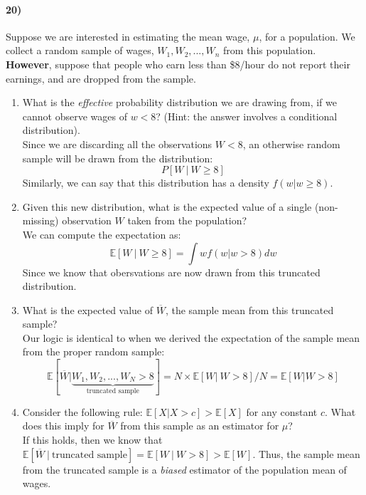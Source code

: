 \documentclass[12pt]{article}
\newcommand\ov{\overline}
\newcommand\EE{\mathbb{E}}
\numberwithin{equation}{section}
\numberwithin{figure}{section}
\numberwithin{table}{section}
\begin{document}
\paragraph{20)} Suppose we are interested in estimating the mean wage, $\mu$, for a population. We collect a random sample of wages, $W_1,W_2,...,W_n$ from this population. \textbf{However}, suppose that people who earn less than \$8/hour do not report their earnings, and are dropped from the sample.
\begin{enumerate}
\item What is the \emph{effective} probability distribution we are drawing from, if we cannot observe wages of $w<8$? (Hint: the answer involves a conditional distribution). \\
{\color{blue}
Since we are discarding all the observations $W<8$, an otherwise random sample will be drawn from the distribution: \\
\[P[W\ |\ W\geq8]\]
Similarly, we can say that this distribution has a density $f(w|w\geq8)$.
}

\item Given this new distribution, what is the expected value of a single (non-missing) observation $W$ taken from the population? \\
{\color{blue}
We can compute the expectation as:
\[\EE[W\ |\ W\geq 8] = \int wf(w|w>8)dw\]
Since we know that obersvations are now drawn from this truncated distribution.
}

\item What is the expected value of $\ov{W}$, the sample mean from this truncated sample?\\
{\color{blue}
Our logic is identical to when we derived the expectation of the sample mean from the proper random sample:
\[\EE[\ov{W}|\underbrace{W_1,W_2,...,W_N>8}_{\text{truncated sample}}] = N\times \EE[W|\ W>8]/N = \EE[W|W>8]\]
}

\item Consider the following rule: $\EE[X|X>c]>\EE[X]$ for any constant $c$. What does this imply for $\ov{W}$ from this sample as an estimator for $\mu$?\\
{\color{blue} If this holds, then we know that $\EE[\ov{W}\ |\ \text{truncated sample}] = \EE[W\ |\ W>8]>\EE[W]$. Thus, the sample mean from the truncated sample is a \emph{biased} estimator of the population mean of wages.
}
\end{enumerate}
\end{document}
